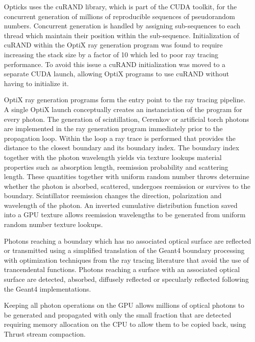 \documentclass[a4paper]{jpconf}
\begin{document}
Opticks uses the cuRAND\cite{curandURL} library, which is part of the CUDA\cite{cudaPaper}\cite{cudaURL} toolkit, 
for the concurrent generation of millions of reproducible sequences of pseudorandom numbers. Concurrent generation is handled by assigning 
sub-sequences to each thread which maintain their position within the sub-sequence. Initialization of cuRAND within the 
OptiX ray generation program was found to require increasing the stack size by a factor of 10 which led to 
poor ray tracing performance. To avoid this issue a cuRAND initialization was moved to a separate CUDA launch, allowing 
OptiX programs to use cuRAND without having to initialize it.

OptiX ray generation programs form the entry point to the ray tracing pipeline. 
A single OptiX launch conceptually creates an instanciation of the program for every photon. 
The generation of scintillation, Cerenkov or artificial torch photons 
are implemented in the ray generation program immediately prior to the propagation loop.
Within the loop a ray trace is performed that provides the distance to the closest boundary and its boundary index.
The boundary index together with the photon wavelength yields via texture lookups material properties 
such as absorption length, reemission probability and scattering length. 
These quantities together with uniform random number throws determine 
whether the photon is aborbed, scattered, undergoes reemission or survives to the boundary. 
Scintillator reemission changes the direction, polarization and wavelength of the photon. 
An inverted cumulative distribution function saved into a GPU texture allows reemission wavelengths 
to be generated from uniform random number texture lookups.

Photons reaching a boundary which has no associated optical surface are reflected or 
transmitted using a simplified translation of the Geant4 boundary processing 
with optimization techniques from the ray tracing literature that avoid the 
use of trancendental functions. Photons reaching a surface with an associated optical 
surface are detected, absorbed, diffusely reflected or specularly reflected following 
the Geant4 implementations. 

Keeping all photon operations on the GPU allows millions of optical photons 
to be generated and propagated with only the small fraction that are detected 
requiring memory allocation on the CPU to allow them to 
be copied back, using Thrust stream compaction.
\end{document}

